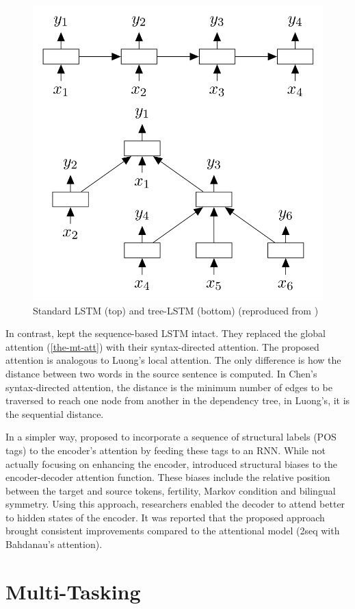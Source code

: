 \begin{figure}[t]
    \centering
    \includegraphics[width=0.7\linewidth]{img/tree-lstm.png}
    \caption{Standard LSTM (top) and tree-LSTM (bottom) (reproduced from \cite{DBLP:conf/acl/TaiSM15})}
    \label{fig:tree-lstm}
\end{figure}

In contrast, \cite{DBLP:journals/corr/abs-1711-04231} kept the sequence-based LSTM intact.
They replaced the global attention (\cref{the-mt-att}) with their syntax-directed attention.
The proposed attention is analogous to Luong's local attention.
The only difference is how the distance between two words in the source sentence is computed.
In Chen's syntax-directed attention, the distance is the minimum number of edges to be traversed to reach one node from another in the dependency tree, in Luong's, it is the sequential distance.

In a simpler way, \cite{DBLP:conf/acl/LiXTZZZ17} proposed to incorporate a sequence of structural labels (POS tags) to the encoder's attention by feeding these tags to an RNN.
While not actually focusing on enhancing the encoder, \cite{DBLP:conf/naacl/CohnHVYDH16} introduced structural biases to the encoder-decoder attention function.
These biases include the relative position between the target and source tokens, fertility, Markov condition and bilingual symmetry.
Using this approach, researchers enabled the decoder to attend better to hidden states of the encoder.
It was reported that the proposed approach brought consistent improvements compared to the attentional model (\seq2seq with Bahdanau's attention).

\section{Multi-Tasking}
\label{lit-mult}

